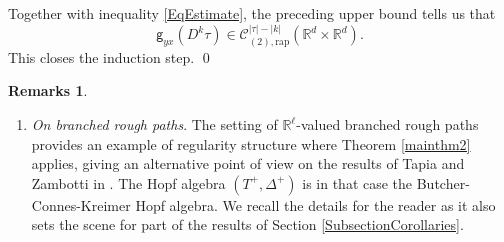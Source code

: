 \documentclass[11pt]{article}
\newcommand{\skpt}{\smallskip}
\numberwithin{equation}{section}
\theoremstyle{plain}
\theoremstyle{definition}
\newtheorem*{remarks*} {Remarks}
\newcommand{\rap}{\mathrm{rap}}
\newcommand{\sfg}{\mathsf{g}}
\newcommand{\bbR}{\mathbb{R}}
\newcommand{\mcC}{\mathcal{C}}
\begin{document}
Together with inequality \eqref{EqEstimate}, the preceding upper bound tells us that\vspace*{-3pt}
\[
{\sfg}_{yx}(D^k\tau)\in\mcC^{|\tau|-|k|}_{(2),\rap}(\bbR^d\times\bbR^d).
\]
This closes the induction step. \qed

\skpt
\begin{remarks*}
\begin{enumerate}
\item
\emph{On branched rough paths}. The setting of $\bbR^\ell$-valued branched rough paths provides an example of regularity structure where Theorem \ref{mainthm2} applies, giving an alternative point of view on the results of Tapia and Zambotti in \cite{TZ18}. The Hopf algebra $(T^+,\Delta^+)$ is in that case the Butcher-Connes-Kreimer Hopf algebra. We recall the details for the reader as it also sets the scene for part of the results of Section \ref{SubsectionCorollaries}.


\end{enumerate}
\end{remarks*}
\end{document}
